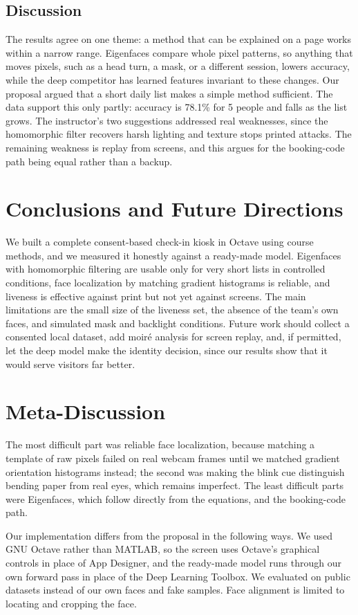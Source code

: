\documentclass[conference,a4paper]{IEEEtran}
\begin{document}
\subsection{Discussion}
The results agree on one theme: a method that can be explained on a page works within a narrow range. Eigenfaces compare whole pixel patterns, so anything that moves pixels, such as a head turn, a mask, or a different session, lowers accuracy, while the deep competitor has learned features invariant to these changes. Our proposal argued that a short daily list makes a simple method sufficient. The data support this only partly: accuracy is 78.1\% for 5 people and falls as the list grows. The instructor's two suggestions addressed real weaknesses, since the homomorphic filter recovers harsh lighting and texture stops printed attacks. The remaining weakness is replay from screens, and this argues for the booking-code path being equal rather than a backup.

\section{Conclusions and Future Directions}
We built a complete consent-based check-in kiosk in Octave using course methods, and we measured it honestly against a ready-made model. Eigenfaces with homomorphic filtering are usable only for very short lists in controlled conditions, face localization by matching gradient histograms is reliable, and liveness is effective against print but not yet against screens. The main limitations are the small size of the liveness set, the absence of the team's own faces, and simulated mask and backlight conditions. Future work should collect a consented local dataset, add moiré analysis for screen replay, and, if permitted, let the deep model make the identity decision, since our results show that it would serve visitors far better.

\section{Meta-Discussion}
The most difficult part was reliable face localization, because matching a template of raw pixels failed on real webcam frames until we matched gradient orientation histograms instead; the second was making the blink cue distinguish bending paper from real eyes, which remains imperfect. The least difficult parts were Eigenfaces, which follow directly from the equations, and the booking-code path.

Our implementation differs from the proposal in the following ways. We used GNU Octave rather than MATLAB, so the screen uses Octave's graphical controls in place of App Designer, and the ready-made model runs through our own forward pass in place of the Deep Learning Toolbox. We evaluated on public datasets instead of our own faces and fake samples. Face alignment is limited to locating and cropping the face.
\end{document}
